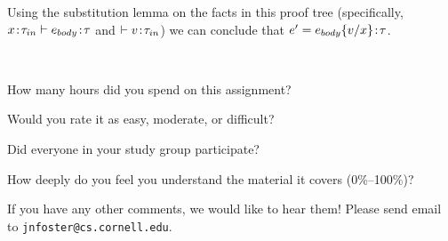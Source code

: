 \documentclass[10pt]{article}
\begin{document}
\begin{exercise}
\begin{enumerate}[\hspace{20pt}]
	Using the substitution lemma on the facts in this proof tree (specifically,
	$x \!:\! \tau_{in} \vdash e_{body} \!:\! \tau $ and $\vdash v \!:\! \tau_{in}$) 
	we can conclude that $e' = e_{body}\{v/x\} \!:\! \tau$. \checkmark
\end{enumerate}
\end{exercise}

\begin{debriefing} \hfill\\[-4ex]
\begin{enumerate*}
\item How many hours did you spend on this assignment? 
\item Would you rate it as easy, moderate, or difficult? 
\item Did everyone in your study group participate? 
\item How deeply do you feel you understand the material it covers (0\%--100\%)? 
\item If you have any other comments, we would like to hear them!
  Please send email to \texttt{jnfoster@cs.cornell.edu}.
\end{enumerate*}
\end{debriefing}
\end{document}
